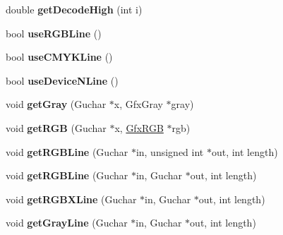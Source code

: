 \begin{DoxyCompactItemize}
double {\bfseries get\+Decode\+High} (int i)
\item 
\mbox{\label{class_gfx_image_color_map_a4a6239ef844b8acee2b45763820f99e0}} 
bool {\bfseries use\+R\+G\+B\+Line} ()
\item 
\mbox{\label{class_gfx_image_color_map_a46dc7e415d73216453e2b32196ad251a}} 
bool {\bfseries use\+C\+M\+Y\+K\+Line} ()
\item 
\mbox{\label{class_gfx_image_color_map_a76a06430f365a5c01794a04b0d6c9874}} 
bool {\bfseries use\+Device\+N\+Line} ()
\item 
\mbox{\label{class_gfx_image_color_map_a2a6c923341dbfa50daa7ae59eccc22d5}} 
void {\bfseries get\+Gray} (Guchar $\ast$x, Gfx\+Gray $\ast$gray)
\item 
\mbox{\label{class_gfx_image_color_map_ad1df57e9b4b77151b568f0371eace5c4}} 
void {\bfseries get\+R\+GB} (Guchar $\ast$x, \hyperlink{struct_gfx_r_g_b}{Gfx\+R\+GB} $\ast$rgb)
\item 
\mbox{\label{class_gfx_image_color_map_aef90af3101c3237df3fdab51a8eb48a5}} 
void {\bfseries get\+R\+G\+B\+Line} (Guchar $\ast$in, unsigned int $\ast$out, int length)
\item 
\mbox{\label{class_gfx_image_color_map_aa9ede85c53c6f130a13d62c92dd462ac}} 
void {\bfseries get\+R\+G\+B\+Line} (Guchar $\ast$in, Guchar $\ast$out, int length)
\item 
\mbox{\label{class_gfx_image_color_map_a805fafdec4916957827797c06c1e000c}} 
void {\bfseries get\+R\+G\+B\+X\+Line} (Guchar $\ast$in, Guchar $\ast$out, int length)
\item 
\mbox{\label{class_gfx_image_color_map_ad749f5fed045855f3144ec8df7fefbc3}} 
void {\bfseries get\+Gray\+Line} (Guchar $\ast$in, Guchar $\ast$out, int length)
\item 
\mbox{\label{class_gfx_image_color_map_a560f23829193eaa89e7beed85429b3ed}} 

\end{DoxyCompactItemize}
